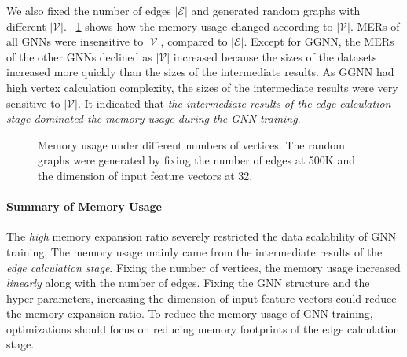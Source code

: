 We also fixed the number of edges $|\mathcal{E}|$ and generated random graphs with different $|\mathcal{V}|$.
%
\figurename~\ref{fig:exp_memory_expansion_ratio_input_graph_number_of_vertices_fixed_edge} shows how the memory usage changed according to $|\mathcal{V}|$.
%
MERs of all GNNs were insensitive to $|\mathcal{V}|$, compared to $|\mathcal{E}|$.
%
Except for GGNN, the MERs of the other GNNs declined as $|\mathcal{V}|$ increased because the sizes of the datasets increased more quickly than the sizes of the intermediate results.
%
As GGNN had high vertex calculation complexity, the sizes of the intermediate results were very sensitive to $|\mathcal{V}|$.
%
It indicated that \emph{the intermediate results of the edge calculation stage dominated the memory usage during the GNN training}.

\begin{figure}[H]
    \centering
    \caption{Memory usage under different numbers of vertices. The random graphs were generated by fixing the number of edges at 500K and the dimension of input feature vectors at 32.}
    \label{fig:exp_memory_expansion_ratio_input_graph_number_of_vertices_fixed_edge}
\end{figure}

\paragraph{Summary of Memory Usage}
%
The \emph{high} memory expansion ratio severely restricted the data scalability of GNN training.
%
The memory usage mainly came from the intermediate results of the \emph{edge calculation stage}.
%
Fixing the number of vertices, the memory usage increased \emph{linearly} along with the number of edges.
%
Fixing the GNN structure and the hyper-parameters, increasing the dimension of input feature vectors could reduce the memory expansion ratio.
%
To reduce the memory usage of GNN training, optimizations should focus on reducing memory footprints of the edge calculation stage.


